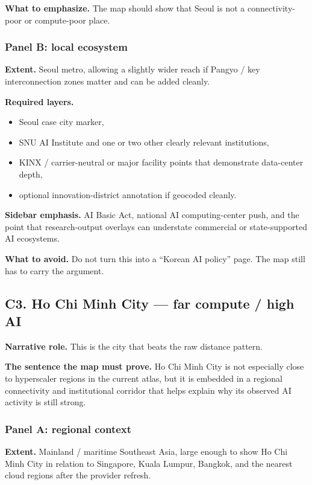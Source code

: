 \documentclass[11pt]{article}
\begin{document}
\textbf{What to emphasize.} The map should show that Seoul is not a connectivity-poor or compute-poor place.

\subsubsection*{Panel B: local ecosystem}
\textbf{Extent.} Seoul metro, allowing a slightly wider reach if Pangyo / key interconnection zones matter and can be added cleanly.

\textbf{Required layers.}
\begin{itemize}[leftmargin=1.4em,itemsep=0.18em]
    \item Seoul case city marker,
    \item SNU AI Institute and one or two other clearly relevant institutions,
    \item KINX / carrier-neutral or major facility points that demonstrate data-center depth,
    \item optional innovation-district annotation if geocoded cleanly.
\end{itemize}

\textbf{Sidebar emphasis.} AI Basic Act, national AI computing-center push, and the point that research-output overlays can understate commercial or state-supported AI ecosystems.

\textbf{What to avoid.} Do not turn this into a ``Korean AI policy'' page. The map still has to carry the argument.

\subsection{C3. Ho Chi Minh City --- far compute / high AI}

\textbf{Narrative role.} This is the city that beats the raw distance pattern.

\textbf{The sentence the map must prove.} Ho Chi Minh City is not especially close to hyperscaler regions in the current atlas, but it is embedded in a regional connectivity and institutional corridor that helps explain why its observed AI activity is still strong.

\subsubsection*{Panel A: regional context}
\textbf{Extent.} Mainland / maritime Southeast Asia, large enough to show Ho Chi Minh City in relation to Singapore, Kuala Lumpur, Bangkok, and the nearest cloud regions after the provider refresh.
\end{document}

